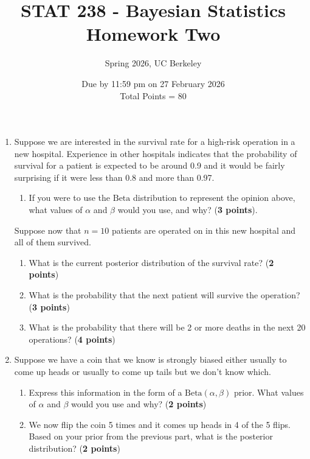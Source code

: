 \documentclass{scrartcl}
\begin{document}
\title{STAT 238 - Bayesian Statistics \\
 Homework Two} 
\subtitle{Spring 2026, UC Berkeley}
\author{Due by 11:59 pm on 27 February 2026 \\ Total Points = 80} 

\date{}
\maketitle




\begin{enumerate}

\item Suppose we are interested in the survival rate for a high-risk
  operation in a new hospital. Experience in other hospitals indicates
  that the probability of survival for a patient is expected to be
  around 0.9 and it would be fairly surprising if it were less than
  0.8 and more than 0.97. 
  \begin{enumerate}
  \item If you were to use the $\text{Beta}$ distribution to represent the
    opinion above, what values of $\alpha$ and $\beta$ would you use,
    and why? (\textbf{3 points}). 
  \end{enumerate}
  Suppose now that $n = 10$ patients are operated on in this new
  hospital and all of them survived.
  \begin{enumerate}
  \item What is the current posterior distribution of the survival
    rate? (\textbf{2 points})
  \item  What is the probability that the next patient will survive
    the operation? (\textbf{3 points})
  \item What is the probability that there will be 2 or more deaths in
    the next 20 operations? (\textbf{4 points}) 
  \end{enumerate}

\item Suppose we have a coin that we know is strongly biased either
  usually to come up heads or usually to come up tails but we don't
  know which.
  \begin{enumerate}
  \item Express this information in the form of a $\text{Beta}(\alpha,
    \beta)$ prior. What values of $\alpha$ and $\beta$ would you use
    and why? (\textbf{2 points})
   \item We now flip the coin 5 times and it comes up heads in 4 of
     the 5 flips. Based on your  prior from the previous part, what is
     the posterior distribution? (\textbf{2  points})
   \end{enumerate}


\end{enumerate}
\end{document}
